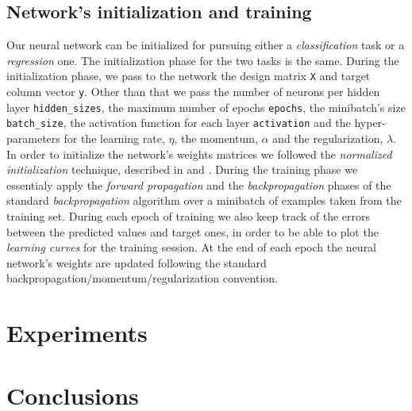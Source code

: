 \documentclass[11pt,twoside]{article}
\begin{document}
        \subsection{Network's initialization and training} %
        \label{sub:the_training_algorithm}
        Our neural network can be initialized for pursuing either a \textit{classification} task or a
        \textit{regression} one. The initialization phase for the two tasks is the same.
        During the initialization phase, we pass to the network the design matrix \texttt{X} and target column
        vector \texttt{y}. Other than that we pass the number of neurons per hidden layer
        \texttt{hidden\_sizes}, the maximum number of epochs \texttt{epochs}, the minibatch's size
        \texttt{batch\_size}, the activation function for each layer \texttt{activation} and the hyper-parameters
        for the learning rate, \texttt{$\eta$}, the momentum, \texttt{$\alpha$} and the regularization,
        \texttt{$\lambda$}. In order to initialize the network's weights matrices we followed the
        \textit{normalized initialization} technique, described in \cite{deep_learning} and \cite{initialization}.
        During the training phase we essentialy apply the \textit{forward propagation} and the
        \textit{backpropagation} phases of the standard \textit{backpropagation} algorithm over a minibatch of
        examples taken from the training set. During each epoch of training we also keep track of the errors
        between the predicted values and target ones, in order to be able to plot the \textit{learning curves}
        for the training session. At the end of each epoch the neural network's weights are updated following
        the standard backpropagation/momentum/regularization convention.


\section{Experiments} %
\label{sec:experiments}



\section{Conclusions}
\end{document}
